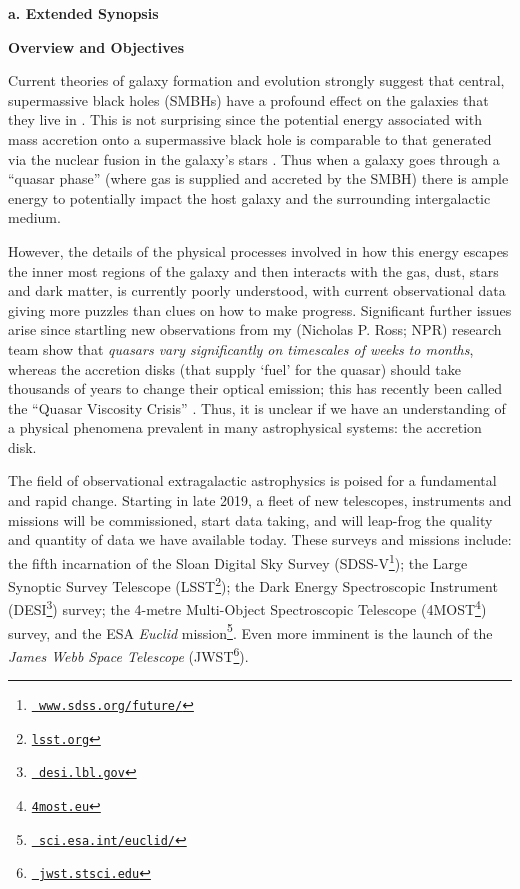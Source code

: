 \documentclass[oneside, a4paper, onecolumn, 11pt]{article}
\begin{document}
\vspace{-16pt}

\smallskip
\smallskip
\noindent
{\bf{\textcolor{Cerulean}{a. Extended Synopsis}}} 
\vspace{6pt}

\noindent
\large
{\bf{\textcolor{Cerulean}{Overview and Objectives}}}
\normalsize

\smallskip
\noindent
Current theories of galaxy formation and evolution strongly suggest
that central, supermassive black holes (SMBHs) have a profound effect
on the galaxies that they live in \citep[e.g., ][]{KormendyHo2013}.
This is not surprising since the potential energy associated with mass
accretion onto a supermassive black hole is comparable to that
generated via the nuclear fusion in the galaxy's stars \citep[see
e.g. ][]{Fabian2012}. Thus when a galaxy goes through a ``quasar
phase'' (where gas is supplied and accreted by the SMBH) there is
ample energy to potentially impact the host galaxy and the surrounding
intergalactic medium.

\smallskip
\smallskip
\noindent
However, the details of the physical processes involved in how this
energy escapes the inner most regions of the galaxy and then interacts
with the gas, dust, stars and dark matter, is currently poorly
understood, with current observational data giving more puzzles than
clues on how to make progress. Significant further issues arise since
startling new observations from my (Nicholas P. Ross; NPR) research
team \citep{MacLeod2016, Ross2018} show that {\it quasars vary
significantly on timescales of weeks to months}, whereas the accretion
disks (that supply `fuel' for the quasar) should take thousands of
years to change their optical emission; this has recently been called
the ``Quasar Viscosity Crisis'' \citep[e.g., ][]{Lawrence2018}. Thus,
it is unclear if we have an understanding of a physical phenomena
prevalent in many astrophysical systems: the accretion disk.

\smallskip
\smallskip
\noindent
The field of observational extragalactic astrophysics is poised for a
fundamental and rapid change. Starting in late 2019, a fleet of new
telescopes, instruments and missions will be commissioned, start data
taking, and will leap-frog the quality and quantity of data we have
available today. These surveys and missions include: the fifth
incarnation of the Sloan Digital Sky Survey
(SDSS-V\footnote{\href{www.sdss.org/future/}{{\tt
www.sdss.org/future/}}}); the Large Synoptic Survey Telescope
(LSST\footnote{\href{lsst.org}{{\tt lsst.org}}}); the Dark Energy
Spectroscopic Instrument (DESI\footnote{\href{desi.lbl.gov}{{\tt
desi.lbl.gov}}}) survey; the 4-metre Multi-Object Spectroscopic
Telescope (4MOST\footnote{\href{4most.eu}{{\tt 4most.eu}}}) survey,
and the ESA {\it Euclid}
mission\footnote{\href{sci.esa.int/euclid/}{{\tt
sci.esa.int/euclid/}}}. Even more imminent is the launch of the {\it
James Webb Space Telescope} (JWST\footnote{\href{jwst.stsci.edu}{{\tt
jwst.stsci.edu}}}).
\end{document}
